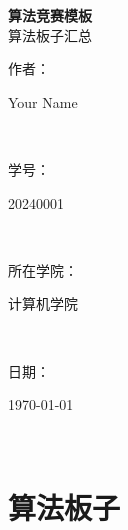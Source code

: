 \documentclass[UTF8]{ctexart}
\begin{document}
\begin{titlepage}
  \centering
  \vspace*{2cm}


  {\huge\bfseries 算法竞赛模板}\\[0.8cm]
  {\Large 算法板子汇总}\\[2.5cm]

  \noindent
  \parbox{2.5cm}{\raggedleft 作\quad 者：}\parbox{6cm}{Your Name}\\[0.3cm]
  \parbox{2.5cm}{\raggedleft 学\quad 号：}\parbox{6cm}{20240001}\\[0.3cm]
  \parbox{2.5cm}{\raggedleft 所在学院：}\parbox{6cm}{计算机学院}\\[0.3cm]
  \parbox{2.5cm}{\raggedleft 日\quad 期：}\parbox{6cm}{\today}\\[2cm]

  \vfill
\end{titlepage}
\newpage

\section*{算法板子}
\tableofcontents
\newpage














\end{document}
